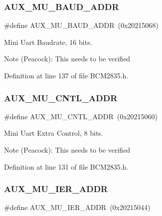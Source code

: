 \subsubsection{\texorpdfstring{A\+U\+X\+\_\+\+M\+U\+\_\+\+B\+A\+U\+D\+\_\+\+A\+D\+DR}{AUX\_MU\_BAUD\_ADDR}}
{\footnotesize\ttfamily \#define A\+U\+X\+\_\+\+M\+U\+\_\+\+B\+A\+U\+D\+\_\+\+A\+D\+DR~(0x20215068)}



Mini Uart Baudrate, 16 bits. 

\begin{DoxyNote}{Note}
(Peacock)\+: This needs to be verified 
\end{DoxyNote}


Definition at line 137 of file B\+C\+M2835.\+h.

\mbox{\label{group__UART_ga9c3d11375873d03e2bb8b93d3ae970fb}} 
\subsubsection{\texorpdfstring{A\+U\+X\+\_\+\+M\+U\+\_\+\+C\+N\+T\+L\+\_\+\+A\+D\+DR}{AUX\_MU\_CNTL\_ADDR}}
{\footnotesize\ttfamily \#define A\+U\+X\+\_\+\+M\+U\+\_\+\+C\+N\+T\+L\+\_\+\+A\+D\+DR~(0x20215060)}



Mini Uart Extra Control, 8 bits. 

\begin{DoxyNote}{Note}
(Peacock)\+: This needs to be verified 
\end{DoxyNote}


Definition at line 131 of file B\+C\+M2835.\+h.

\mbox{\label{group__UART_gab7f0b281001eba1983b44e5bd3de3624}} 
\subsubsection{\texorpdfstring{A\+U\+X\+\_\+\+M\+U\+\_\+\+I\+E\+R\+\_\+\+A\+D\+DR}{AUX\_MU\_IER\_ADDR}}
{\footnotesize\ttfamily \#define A\+U\+X\+\_\+\+M\+U\+\_\+\+I\+E\+R\+\_\+\+A\+D\+DR~(0x20215044)}



